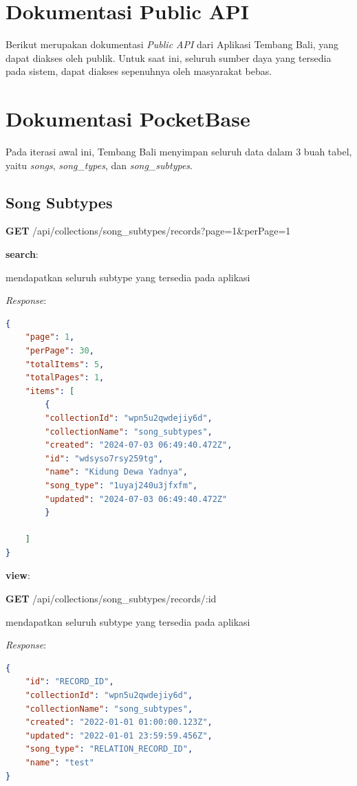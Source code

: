\section{Dokumentasi Public API}
Berikut merupakan dokumentasi \textit{Public API} dari Aplikasi Tembang Bali, yang dapat diakses oleh publik. Untuk saat ini, seluruh sumber daya yang tersedia pada sistem, dapat diakses sepenuhnya oleh masyarakat bebas.\


\section{Dokumentasi PocketBase}
Pada iterasi awal ini, Tembang Bali menyimpan seluruh data dalam 3 buah tabel, yaitu \textit{songs}, \textit{song\_types}, dan \textit{song\_subtypes}.

\subsection*{Song Subtypes}
\textbf{GET} /api/collections/song\_subtypes/records?page=1\&perPage=1

\textbf{search}:

\indent mendapatkan seluruh subtype yang tersedia pada aplikasi

\textit{Response}:
\begin{lstlisting}[language=json,firstnumber=1]
{
    "page": 1,
    "perPage": 30,
    "totalItems": 5,
    "totalPages": 1,
    "items": [
        {
        "collectionId": "wpn5u2qwdejiy6d",
        "collectionName": "song_subtypes",
        "created": "2024-07-03 06:49:40.472Z",
        "id": "wdsyso7rsy259tg",
        "name": "Kidung Dewa Yadnya",
        "song_type": "1uyaj240u3jfxfm",
        "updated": "2024-07-03 06:49:40.472Z"
        }

    ]
}
        \end{lstlisting}

\textbf{view}:

\textbf{GET} /api/collections/song\_subtypes/records/:id

\indent mendapatkan seluruh subtype  yang tersedia pada aplikasi

\textit{Response}:
\begin{lstlisting}[language=json,firstnumber=1]
{
    "id": "RECORD_ID",
    "collectionId": "wpn5u2qwdejiy6d",
    "collectionName": "song_subtypes",
    "created": "2022-01-01 01:00:00.123Z",
    "updated": "2022-01-01 23:59:59.456Z",
    "song_type": "RELATION_RECORD_ID",
    "name": "test"
}
\end{lstlisting}

